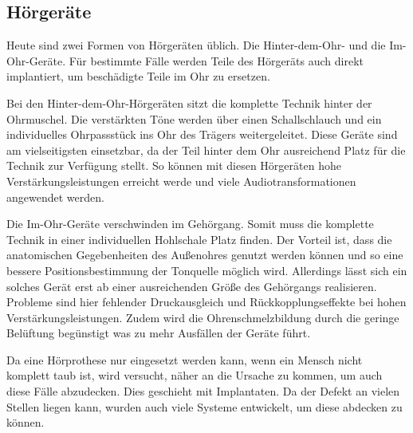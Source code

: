 
\subsection{Hörgeräte}
Heute sind zwei Formen von Hörgeräten üblich. Die Hinter-dem-Ohr- und die Im-Ohr-Geräte. Für
bestimmte Fälle werden Teile des Hörgeräts auch direkt implantiert, um beschädigte Teile im Ohr zu
ersetzen.

Bei den Hinter-dem-Ohr-Hörgeräten sitzt die komplette Technik hinter der Ohrmuschel. Die verstärkten
Töne werden über einen Schallschlauch und ein individuelles Ohrpassstück ins Ohr des Trägers
weitergeleitet. Diese Geräte sind am vielseitigsten einsetzbar, da der Teil hinter dem Ohr
ausreichend Platz für die Technik zur Verfügung stellt. So können mit diesen Hörgeräten hohe
Verstärkungsleistungen erreicht werde und viele Audiotransformationen angewendet werden.

Die Im-Ohr-Geräte verschwinden im Gehörgang. Somit muss die komplette Technik in einer individuellen
Hohlschale Platz finden. Der Vorteil ist, dass die anatomischen Gegebenheiten des Außenohres genutzt
werden können und so eine bessere Positionsbestimmung der Tonquelle möglich wird. Allerdings lässt
sich ein solches Gerät erst ab einer ausreichenden Größe des Gehörgangs realisieren. Probleme sind
hier fehlender Druckausgleich und Rückkopplungseffekte bei hohen Verstärkungsleistungen. Zudem wird
die Ohrenschmelzbildung durch die geringe Belüftung begünstigt was zu mehr Ausfällen der Geräte
führt.

Da eine Hörprothese nur eingesetzt werden kann, wenn ein Mensch nicht komplett taub ist, wird
versucht, näher an die Ursache zu kommen, um auch diese Fälle abzudecken. Dies geschieht mit
Implantaten. Da der Defekt an vielen Stellen liegen kann, wurden auch viele Systeme entwickelt, um
diese abdecken zu können.

